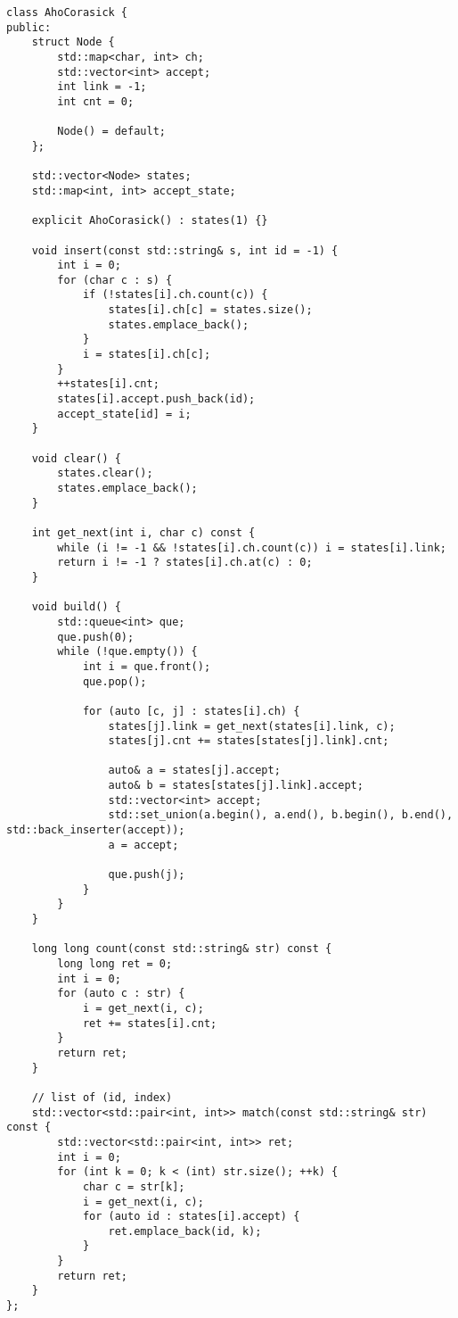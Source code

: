 \begin{lstlisting}
class AhoCorasick {
public:
    struct Node {
        std::map<char, int> ch;
        std::vector<int> accept;
        int link = -1;
        int cnt = 0;

        Node() = default;
    };

    std::vector<Node> states;
    std::map<int, int> accept_state;

    explicit AhoCorasick() : states(1) {}

    void insert(const std::string& s, int id = -1) {
        int i = 0;
        for (char c : s) {
            if (!states[i].ch.count(c)) {
                states[i].ch[c] = states.size();
                states.emplace_back();
            }
            i = states[i].ch[c];
        }
        ++states[i].cnt;
        states[i].accept.push_back(id);
        accept_state[id] = i;
    }

    void clear() {
        states.clear();
        states.emplace_back();
    }

    int get_next(int i, char c) const {
        while (i != -1 && !states[i].ch.count(c)) i = states[i].link;
        return i != -1 ? states[i].ch.at(c) : 0;
    }

    void build() {
        std::queue<int> que;
        que.push(0);
        while (!que.empty()) {
            int i = que.front();
            que.pop();

            for (auto [c, j] : states[i].ch) {
                states[j].link = get_next(states[i].link, c);
                states[j].cnt += states[states[j].link].cnt;

                auto& a = states[j].accept;
                auto& b = states[states[j].link].accept;
                std::vector<int> accept;
                std::set_union(a.begin(), a.end(), b.begin(), b.end(), std::back_inserter(accept));
                a = accept;

                que.push(j);
            }
        }
    }

    long long count(const std::string& str) const {
        long long ret = 0;
        int i = 0;
        for (auto c : str) {
            i = get_next(i, c);
            ret += states[i].cnt;
        }
        return ret;
    }

    // list of (id, index)
    std::vector<std::pair<int, int>> match(const std::string& str) const {
        std::vector<std::pair<int, int>> ret;
        int i = 0;
        for (int k = 0; k < (int) str.size(); ++k) {
            char c = str[k];
            i = get_next(i, c);
            for (auto id : states[i].accept) {
                ret.emplace_back(id, k);
            }
        }
        return ret;
    }
};
\end{lstlisting}